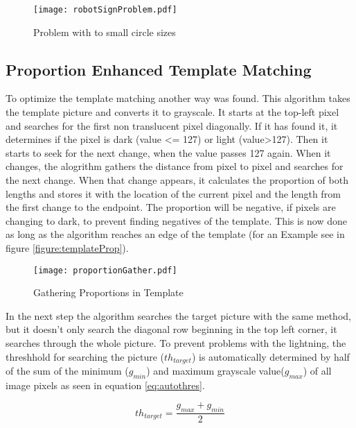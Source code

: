 \begin{figure}[H]
\begin{center}
  \texttt{[image: robotSignProblem.pdf]}
  \caption{Problem with to small circle sizes}
  \label{figure:problemCircles}
\end{center}
\end{figure}

\subsection{Proportion Enhanced Template Matching}
To optimize the template matching another way was found. This algorithm
takes the template picture and converts it to grayscale. It starts at the top-left pixel
and searches for the first non translucent pixel diagonally. If it has found it,
it determines if the pixel is dark (value <= 127) or light (value>127). Then it
starts to seek for the next change, when the value passes 127 again.
When it changes, the alogrithm gathers the distance from pixel to pixel and searches for the next change.
When that change appears, it calculates the proportion of both lengths and stores it 
with the location of the current pixel and the length from the first change to the endpoint. 
The proportion will be negative, if pixels are changing to dark, to prevent finding negatives of the template. 
This is now done as long as the algorithm reaches an edge of the template 
(for an Example see in figure \vref{figure:templateProp}).

\begin{figure}[H]
\begin{center}
  \texttt{[image: proportionGather.pdf]}
  \caption{Gathering Proportions in Template}
  \label{figure:templateProp}
\end{center}
\end{figure}

In the next step the algorithm searches the target picture with the same method, but
it doesn't only search the diagonal row beginning in the top left corner, it searches
through the whole picture. To prevent problems with the lightning, the threshhold
for searching the picture ($th_{target}$) is automatically determined by half of the sum of the 
minimum ($g_{min}$) and maximum grayscale value($g_{max}$) of all image pixels
as seen in equation \vref{eq:autothres}.

	\begin{equation}
		th_{target}=\frac{g_{max}+g_{min}}{2}
		\label{eq:autothres}
	\end{equation}

